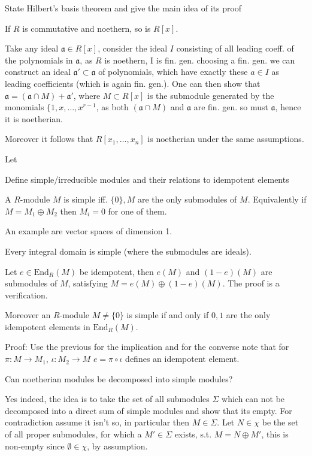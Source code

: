 State Hilbert's basis theorem and give the main idea of its proof

If \(R\) is commutative and noethern, so is \(R[x]\).

Take any ideal \(\mathfrak{a} \in R[x]\), consider the ideal \(I\) consisting of all leading coeff.
of the polynomials in \(\mathfrak{a}\), as \(R\) is noethern, I is fin. gen. choosing a fin. gen.
we can construct an ideal \(\mathfrak{a}' \subset \mathfrak{a}\) of polynomials, which have exactly 
these \(a \in I\) as leading coefficients (which is again fin. gen.). One can then show that \(\mathfrak{a} = (\mathfrak{a} \cap M) + \mathfrak{a}'\),
where \(M \subset R[x]\) is the submodule generated by the monomials \(\{1, x, \dots, x^{r-1}\), as both \((\mathfrak{a} \cap M)\) and \(\mathfrak{a}\)
are fin. gen. so must \(\mathfrak{a}\), hence it is noetherian.


Moreover it follows that \(R[x_1, \dots, x_n]\) is noetherian under the same assumptions.

Let

Define simple/irreducible modules and their relations to idempotent elements

A \(R\)-module \(M\) is simple iff. \(\{0\}, M\) are the only submodules of \(M\).
Equivalently if \(M = M_1 \oplus M_2\) then \(M_i = 0\) for one of them.

An example are vector spaces of dimension 1.

Every integral domain is simple (where the submodules are ideals).

Let \(e \in \text{End}_{R}(M)\) be idempotent, then \(e(M)\) and \((1-e)(M)\) are submodules
of \(M\), satisfying \(M = e(M) \oplus (1 - e)(M)\).
The proof is a verification.

Moreover an \(R\)-module \(M \neq \{0\}\) is simple if and only if \(0, 1\) are the only idempotent
elements in \(\text{End}_R(M)\).

Proof: Use the previous for the implication and for the converse note that for \(\pi : M \to M_1\), \(\iota : M_2 \to M\)
\(e = \pi \circ \iota\) defines an idempotent element.

Can noetherian modules be decomposed into simple modules?

Yes indeed, the idea is to take the set of all submodules \(\Sigma\) which can not be decomposed
into a direct sum of simple modules and show that its empty. For contradiction assume it isn't so,
in particular then \(M \in \Sigma\). Let \(N \in \chi\) be the set of all proper submodules, for which a 
\(M' \in \Sigma\) exists, s.t. \(M = N \oplus M'\), this is non-empty since \(\emptyset \in \chi\), by assumption.

